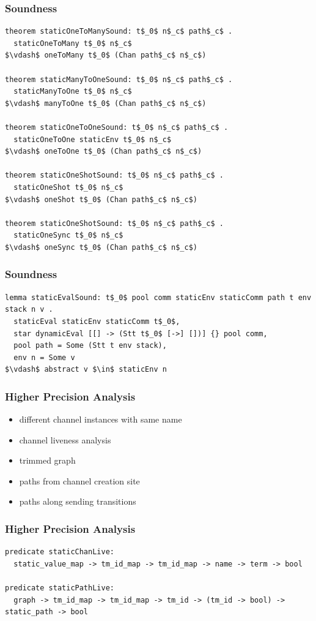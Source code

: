 \documentclass{beamer}
\begin{document}
\begin{frame}[fragile]
	\frametitle{Soundness}
\begin{lstlisting}[language=logic, mathescape]
theorem staticOneToManySound: t$_0$ n$_c$ path$_c$ . 
  staticOneToMany t$_0$ n$_c$
$\vdash$ oneToMany t$_0$ (Chan path$_c$ n$_c$)

theorem staticManyToOneSound: t$_0$ n$_c$ path$_c$ . 
  staticManyToOne t$_0$ n$_c$
$\vdash$ manyToOne t$_0$ (Chan path$_c$ n$_c$)

theorem staticOneToOneSound: t$_0$ n$_c$ path$_c$ . 
  staticOneToOne staticEnv t$_0$ n$_c$
$\vdash$ oneToOne t$_0$ (Chan path$_c$ n$_c$)

theorem staticOneShotSound: t$_0$ n$_c$ path$_c$ .
  staticOneShot t$_0$ n$_c$
$\vdash$ oneShot t$_0$ (Chan path$_c$ n$_c$)

theorem staticOneShotSound: t$_0$ n$_c$ path$_c$ .
  staticOneSync t$_0$ n$_c$
$\vdash$ oneSync t$_0$ (Chan path$_c$ n$_c$)
\end{lstlisting}
\end{frame}


\begin{frame}[fragile]
	\frametitle{Soundness}
\begin{lstlisting}[language=logic, mathescape]
lemma staticEvalSound: t$_0$ pool comm staticEnv staticComm path t env stack n v .
  staticEval staticEnv staticComm t$_0$, 
  star dynamicEval [[] -> (Stt t$_0$ [->] [])] {} pool comm,
  pool path = Some (Stt t env stack), 
  env n = Some v
$\vdash$ abstract v $\in$ staticEnv n 
\end{lstlisting}
\end{frame}


\begin{frame}
\frametitle{Higher Precision Analysis}
\begin{itemize}
\item different channel instances with same name  
\item channel liveness analysis
\item trimmed graph
\item paths from channel creation site
\item paths along sending transitions 
\end{itemize}
\end{frame}

\begin{frame}[fragile]
\frametitle{Higher Precision Analysis}
\begin{lstlisting}[language=logic, mathescape]
predicate staticChanLive:
  static_value_map -> tm_id_map -> tm_id_map -> name -> term -> bool

predicate staticPathLive:
  graph -> tm_id_map -> tm_id_map -> tm_id -> (tm_id -> bool) -> static_path -> bool
\end{lstlisting}
\end{frame}
\end{document}
